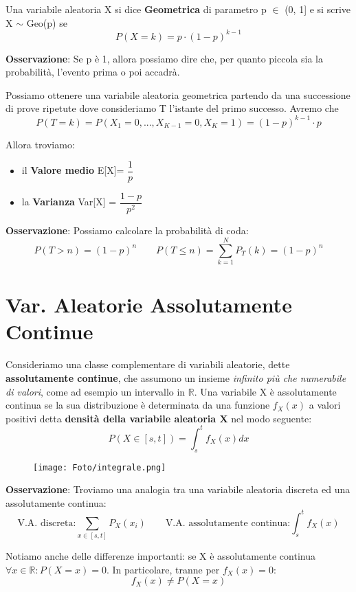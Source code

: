 Una variabile aleatoria X si dice \textbf{Geometrica} di parametro p $\in$ (0, 1] e si scrive X $\sim$ Geo(p) se $$ P(X = k) = p \cdot (1- p)^{k-1} $$

\noindent \textbf{Osservazione}: Se p è 1, allora possiamo dire che, per quanto piccola sia la probabilità, l'evento prima o poi accadrà. \newline

\noindent Possiamo ottenere una variabile aleatoria geometrica partendo da una successione di prove ripetute dove consideriamo T l'istante del primo successo. Avremo che $$ P(T = k) = P(X_1 = 0, ..., X_{K - 1} = 0, X_K = 1) = (1 - p)^{k - 1} \cdot p$$ 

Allora troviamo:
\begin{itemize}
    \item il \textbf{Valore medio} E[X]= $\dfrac{1}{p}$
    \item la \textbf{Varianza} Var[X] = $\dfrac{1 - p}{p^2}$
\end{itemize}

\noindent \textbf{Osservazione}: Possiamo calcolare la probabilità di coda: $$P(T > n) = (1 - p)^n \qquad P(T \leq n) = \sum_{k=1}^N P_T(k) = (1 - p)^n$$

\newpage
\section{Var. Aleatorie Assolutamente Continue}

Consideriamo una classe complementare di variabili aleatorie, dette \textbf{assolutamente continue}, che assumono un insieme \textit{infinito più che numerabile di valori}, come ad esempio un intervallo in $\mathbb{R}$. \newline Una variabile X è assolutamente continua se la sua distribuzione è determinata da una funzione $f_X(x)$ a valori positivi detta \textbf{densità della variabile aleatoria X} nel modo seguente: $$P(X \in [s, t]) = \int_s^t f_X(x) dx $$

\begin{figure}[h!]
    \centering
    \texttt{[image: Foto/integrale.png]} 
\end{figure}

\noindent \textbf{Osservazione}: Troviamo una analogia tra una variabile aleatoria discreta ed una assolutamente continua: $$ \text{V.A. discreta:} \sum_{x \in [s,t]} P_X(x_i) \qquad \text{V.A. assolutamente continua:} \int_s^t f_X(x) $$ 
 
\noindent Notiamo anche delle differenze importanti: se X è assolutamente continua $\forall x \in \mathbb{R}: P(X = x) = 0 $. In particolare, tranne per $f_X(x)=0$: $$f_X(x) \neq P(X = x)$$

